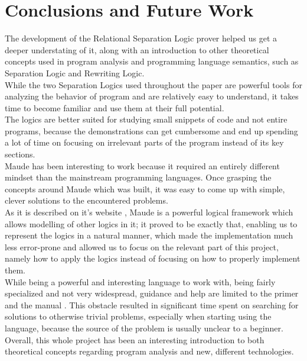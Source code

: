 \documentclass[12pt,a4paper]{article}
\begin{document}
{\section*{Conclusions and Future Work}
The development of the Relational Separation Logic prover helped us get a deeper understating of it, along with an introduction to other theoretical concepts used in program analysis and programming language semantics, such as Separation Logic and Rewriting Logic.
\\

While the two Separation Logics used throughout the paper are powerful tools for analyzing the behavior of program and are relatively easy to understand, it takes time to become familiar and use them at their full potential.
\\

The logics are better suited for studying small snippets of code and not entire programs, because the demonstrations can get cumbersome and end up spending a lot of time on focusing on irrelevant parts of the program instead of its key sections. 
\\

Maude has been interesting to work because it required an entirely different mindset than the mainstream programming languages. Once grasping the concepts around Maude which was built, it was easy to come up with simple, clever solutions to the encountered problems. \\
As it is described on it's website \cite{maudesite}, Maude is a powerful logical framework which allows modelling of other logics in it; it proved to be exactly that, enabling us to represent the logics in a natural manner, which made the implementation much less error-prone and allowed us to focus on the relevant part of this project, namely how to apply the logics instead of focusing on how to properly implement them.
\\

While being a powerful and interesting language to work with, being fairly specialized and not very widespread, guidance and help are limited to the primer \cite{maudeprimer} and the manual \cite{manual}. This obstacle resulted in significant time spent on searching for solutions to otherwise trivial problems, especially when starting using the language, because the source of the problem is usually unclear to a beginner. 
\\

Overall, this whole project has been an interesting introduction to both  theoretical concepts regarding program analysis and new, different technologies. 
\\

}
\end{document}
